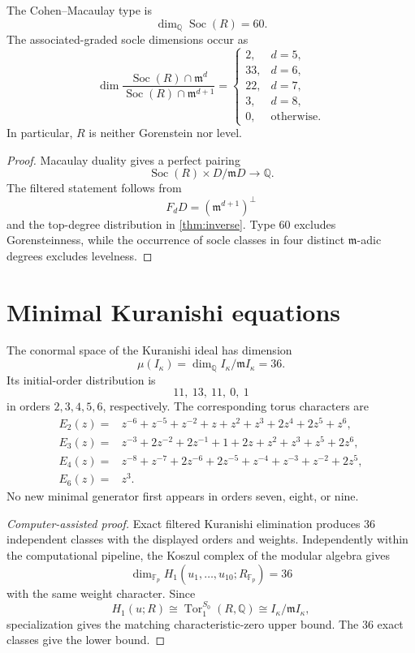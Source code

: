 \documentclass[11pt,reqno]{amsart}
\begin{document}
\begin{corollary}[Socle]
\label{cor:socle}
The Cohen--Macaulay type is
\[
\dim_\mathbb Q\operatorname{Soc}(R)=60.
\]
The associated-graded socle dimensions occur as
\[
\dim\frac{\operatorname{Soc}(R)\cap\mathfrak m^d}
{\operatorname{Soc}(R)\cap\mathfrak m^{d+1}}
=
\begin{cases}
2,&d=5,\\
33,&d=6,\\
22,&d=7,\\
3,&d=8,\\
0,&\text{otherwise}.
\end{cases}
\]
In particular, \(R\) is neither Gorenstein nor level.
\end{corollary}

\begin{proof}
Macaulay duality gives a perfect pairing
\[
\operatorname{Soc}(R)\times D/\mathfrak mD\longrightarrow\mathbb Q.
\]
The filtered statement follows from
\[
F_dD=(\mathfrak m^{d+1})^\perp
\]
and the top-degree distribution in \cref{thm:inverse}.  Type 60 excludes
Gorensteinness, while the occurrence of socle classes in four distinct
\(\mathfrak m\)-adic degrees excludes levelness.
\end{proof}

\section{Minimal Kuranishi equations}
\label{sec:equations}

\begin{theorem}
\label{thm:equations}
The conormal space of the Kuranishi ideal has dimension
\[
\mu(I_\kappa)
=\dim_\mathbb Q I_\kappa/\mathfrak mI_\kappa=36.
\]
Its initial-order distribution is
\[
11,\ 13,\ 11,\ 0,\ 1
\]
in orders \(2,3,4,5,6\), respectively.  The corresponding torus characters
are
\begin{align*}
E_2(z)={}&z^{-6}+z^{-5}+z^{-2}+z+z^2+z^3+2z^4+2z^5+z^6,\\
E_3(z)={}&z^{-3}+2z^{-2}+2z^{-1}+1+2z+z^2+z^3+z^5+2z^6,\\
E_4(z)={}&z^{-8}+z^{-7}+2z^{-6}+2z^{-5}+z^{-4}+z^{-3}+z^{-2}+2z^5,\\
E_6(z)={}&z^3.
\end{align*}
No new minimal generator first appears in orders seven, eight, or nine.
\end{theorem}

\begin{proof}[Computer-assisted proof]
Exact filtered Kuranishi elimination produces 36 independent classes with the
displayed orders and weights.  Independently within the computational
pipeline, the Koszul complex of the modular algebra gives
\[
\dim_{\mathbb F_p}H_1(u_1,\ldots,u_{10};R_{\mathbb F_p})=36
\]
with the same weight character.  Since
\[
H_1(u;R)\cong
\operatorname{Tor}_1^{S_0}(R,\mathbb Q)
\cong I_\kappa/\mathfrak mI_\kappa,
\]
specialization gives the matching characteristic-zero upper bound.  The 36
exact classes give the lower bound.
\end{proof}
\end{document}
